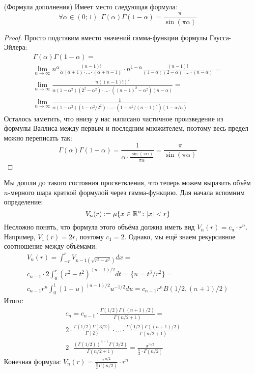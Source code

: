 \begin{theorem} (Формула дополнения)
	Имеет место следующая формула:
	\[
		\forall \alpha \in (0; 1)\ \ \Gamma(\alpha)\Gamma(1 - \alpha) = \frac{\pi}{\sin(\pi \alpha)}
	\]
\end{theorem}

\begin{proof}
	Просто подставим вместо значений гамма-функции формулы Гаусса-Эйлера:
	\begin{multline*}
		\Gamma(\alpha)\Gamma(1 - \alpha) =
		\\
		\lim_{n \to \infty} n^\alpha \frac{(n - 1)!}{\alpha(\alpha + 1) \cdot \ldots \cdot (\alpha + n - 1)} \cdot n^{1 - \alpha} \frac{(n - 1)!}{(1 - \alpha)(2 - \alpha) \cdot \ldots \cdot (n - \alpha)} =
		\\
		\lim_{n \to \infty} \frac{n((n - 1)!)^2}{\alpha(1 - \alpha^2)(2^2 - \alpha^2) \cdot \ldots \cdot ((n - 1)^2 - \alpha^2)(n - \alpha)} =
		\\
		\lim_{n \to \infty} \frac{1}{\alpha(1 - \alpha^2)(1 - \alpha^2 / 2^2) \cdot \ldots \cdot (1 - \alpha^2 / (n - 1)^2)(1 - \alpha / n)}
	\end{multline*}
	Осталось заметить, что внизу у нас написано частичное произведение из формулы Валлиса между первым и последним множителем, поэтому весь предел можно переписать так:
	\[
		\Gamma(\alpha)\Gamma(1 - \alpha) = \frac{1}{\alpha \cdot \frac{\sin(\pi\alpha)}{\pi\alpha}} = \frac{\pi}{\sin(\pi\alpha)}
	\]
\end{proof}

\begin{example}
	Мы дошли до такого состояния просветвления, что теперь можем выразить объём $n$-мерного шара краткой формулой через гамма-функцию. Для начала вспомним определение:
	\[
		V_n(r) := \mu\{x \in \mathbb{R}^n \colon |x| < r\}
	\]
	Несложно понять, что формула этого объёма должна иметь вид $V_n(r) = c_n \cdot r^n$. Например, $V_1(r) = 2r$, поэтому $c_1 = 2$. Однако, мы ещё знаем рекурсивное соотношение между объёмами:
	\begin{multline*}
		V_n(r) = \int_{-r}^r V_{n - 1(\sqrt{r^2 - x^2})}dx =
		\\
		c_{n - 1} \cdot 2\int_0^r (r^2 - t^2)^{(n - 1) / 2}dt = \{u = t^3 / r^2\} =
		\\
		c_{n - 1} r^n \int_0^1 (1 - u)^{(n - 1) / 2} u^{-1 / 2}du = c_{n - 1} r^n B(1 / 2, (n + 1) / 2)
	\end{multline*}
	Итого:
	\begin{multline*}
		c_n = c_{n - 1} \cdot \frac{\Gamma(1 / 2)\Gamma((n + 1) / 2)}{\Gamma(n / 2 + 1)} =
		\\
		2 \cdot \frac{\Gamma(1 / 2)\Gamma(3 / 2)}{\Gamma(2)} \cdot \ldots \cdot \frac{\Gamma(1 / 2)\Gamma((n + 1) / 2)}{\Gamma(n / 2 + 1)} =
		\\
		2 \cdot \frac{(\Gamma(1 / 2))^{n - 1}\Gamma(3 / 2)}{\Gamma(n / 2 + 1)} = \frac{\pi^{n / 2}}{\frac{n}{2} \cdot \Gamma(n / 2)}
	\end{multline*}
	Конечная формула: $V_n(r) = \frac{\pi^{n / 2}}{\frac{n}{2}\Gamma(n / 2)} \cdot r^n$
\end{example}

